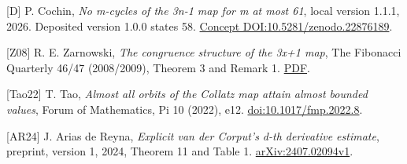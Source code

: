 \documentclass[11pt,a4paper]{article}
\begin{document}
{[}D{]} P. Cochin, \emph{No m-cycles of the 3n-1 map for m at most 61},
local version 1.1.1, 2026. Deposited version 1.0.0 states 58.
\href{https://doi.org/10.5281/zenodo.22876189}{Concept
DOI:10.5281/zenodo.22876189}.

{[}Z08{]} R. E. Zarnowski, \emph{The congruence structure of the 3x+1
map}, The Fibonacci Quarterly 46/47 (2008/2009), Theorem 3 and Remark 1.
\href{https://www.fq.math.ca/Papers1/46_47-2/Zarnowski_1-09.pdf}{PDF}.

{[}Tao22{]} T. Tao, \emph{Almost all orbits of the Collatz map attain
almost bounded values}, Forum of Mathematics, Pi 10 (2022), e12.
\href{https://doi.org/10.1017/fmp.2022.8}{doi:10.1017/fmp.2022.8}.

{[}AR24{]} J. Arias de Reyna, \emph{Explicit van der Corput's d-th
derivative estimate}, preprint, version 1, 2024, Theorem 11 and Table 1.
\href{https://arxiv.org/abs/2407.02094v1}{arXiv:2407.02094v1}.

\endgroup
\end{document}
